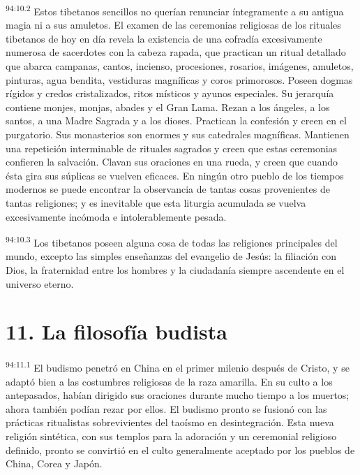 \par
\textsuperscript{94:10.2} Estos tibetanos sencillos no querían renunciar íntegramente a su antigua magia ni a sus amuletos. El examen de las ceremonias religiosas de los rituales tibetanos de hoy en día revela la existencia de una cofradía excesivamente numerosa de sacerdotes con la cabeza rapada, que practican un ritual detallado que abarca campanas, cantos, incienso, procesiones, rosarios, imágenes, amuletos, pinturas, agua bendita, vestiduras magníficas y coros primorosos. Poseen dogmas rígidos y credos cristalizados, ritos místicos y ayunos especiales. Su jerarquía contiene monjes, monjas, abades y el Gran Lama. Rezan a los ángeles, a los santos, a una Madre Sagrada y a los dioses. Practican la confesión y creen en el purgatorio. Sus monasterios son enormes y sus catedrales magníficas. Mantienen una repetición interminable de rituales sagrados y creen que estas ceremonias confieren la salvación. Clavan sus oraciones en una rueda, y creen que cuando ésta gira sus súplicas se vuelven eficaces. En ningún otro pueblo de los tiempos modernos se puede encontrar la observancia de tantas cosas provenientes de tantas religiones; y es inevitable que esta liturgia acumulada se vuelva excesivamente incómoda e intolerablemente pesada.

\par
\textsuperscript{94:10.3} Los tibetanos poseen alguna cosa de todas las religiones principales del mundo, excepto las simples enseñanzas del evangelio de Jesús: la filiación con Dios, la fraternidad entre los hombres y la ciudadanía siempre ascendente en el universo eterno.

\section*{11. La filosofía budista}
\par
\textsuperscript{94:11.1} El budismo penetró en China en el primer milenio después de Cristo, y se adaptó bien a las costumbres religiosas de la raza amarilla. En su culto a los antepasados, habían dirigido sus oraciones durante mucho tiempo a los muertos; ahora también podían rezar por ellos. El budismo pronto se fusionó con las prácticas ritualistas sobrevivientes del taoísmo en desintegración. Esta nueva religión sintética, con sus templos para la adoración y un ceremonial religioso definido, pronto se convirtió en el culto generalmente aceptado por los pueblos de China, Corea y Japón.

